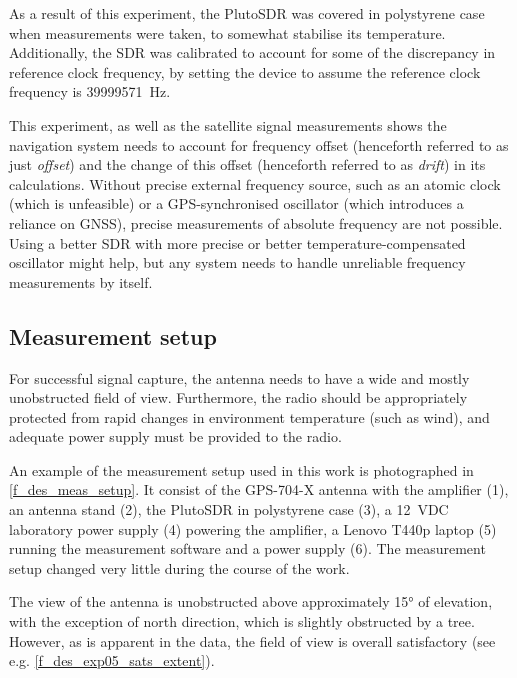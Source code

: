As a result of this experiment, the PlutoSDR was covered in polystyrene case when measurements were taken, to somewhat stabilise its temperature. Additionally, the SDR was calibrated to account for some of the discrepancy in reference clock frequency, by setting the device to assume the reference clock frequency is \qty{39999571}{Hz}.

This experiment, as well as the satellite signal measurements shows the navigation system needs to account for frequency offset (henceforth referred to as just \textit{offset}) and the change of this offset (henceforth referred to as \textit{drift}) in its calculations. Without precise external frequency source, such as an atomic clock (which is unfeasible) or a GPS-synchronised oscillator (which introduces a reliance on GNSS), precise measurements of absolute frequency are not possible. Using a better SDR with more precise or better temperature-compensated oscillator might help, but any system needs to handle unreliable frequency measurements by itself.

\subsection{Measurement setup}
For successful signal capture, the antenna needs to have a wide and mostly unobstructed field of view. Furthermore, the radio should be appropriately protected from rapid changes in environment temperature (such as wind), and adequate power supply must be provided to the radio.

An example of the measurement setup used in this work is photographed in \autoref{f_des_meas_setup}. It consist of the GPS-704-X antenna with the amplifier (1), an antenna stand (2), the PlutoSDR in polystyrene case (3), a \qty{12}{VDC} laboratory power supply (4) powering the amplifier, a Lenovo T440p laptop (5) running the measurement software and a power supply (6). The measurement setup changed very little during the course of the work.

The view of the antenna is unobstructed above approximately \ang{15} of elevation, with the exception of north direction, which is slightly obstructed by a tree. However, as is apparent in the data, the field of view is overall satisfactory (see e.g. \autoref{f_des_exp05_sats_extent}).

